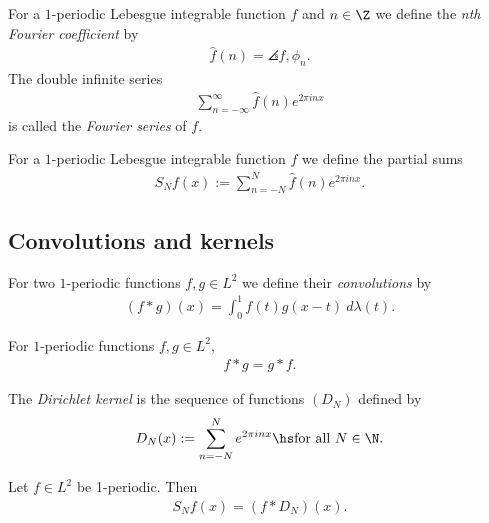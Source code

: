 \documentclass{article}
\begin{document}
\begin{definition}
	For a $1$-periodic Lebesgue integrable function $f$ and $n\in\Z$ we define the \emph{nth Fourier coefficient}
	by
	\begin{align*}
		\hat f(n) = \angles{f, \phi_n}.
	\end{align*}
	The double infinite series
	\begin{align*}
		\sum_{n=-\infty}^\infty \hat f(n) e^{2\pi inx}
	\end{align*}
	is called the \emph{Fourier series} of $f$.
\end{definition}

\begin{definition}
	For a $1$-periodic Lebesgue integrable function $f$ we define the partial sums
	\begin{align*}
		S_Nf(x):=\sum_{n=-N}^N \hat f(n) e^{2\pi inx}.
	\end{align*}
\end{definition}

\subsection{Convolutions and kernels}

\begin{definition}
	For two $1$-periodic functions $f,g\in L^2$ we define their \emph{convolutions}
	by
	\begin{align*}
		(f*g)(x)=\int_0^1 f(t)g(x-t)\:d\lambda(t).
	\end{align*}
\end{definition}

\begin{lemma}[Notes 5.2]
	For $1$-periodic functions $f,g\in L^2$,
	\begin{align*}
		f*g=g*f.
	\end{align*}
\end{lemma}

\begin{definition}
	The \emph{Dirichlet kernel} is the sequence of functions
	$(D_N)$ defined by
	\begin{align*}
		D_N(x):=\sum_{n=-N}^N e^{2\pi inx} \hs \text{for all }N\in\N.
	\end{align*}
\end{definition}

\begin{lemma}
	Let $f\in L^2$ be 1-periodic. Then
	\begin{align*}
		S_Nf(x) = (f*D_N)(x).
	\end{align*}
\end{lemma}
\end{document}
